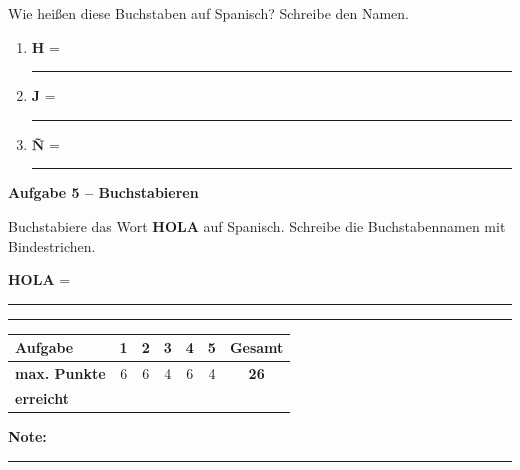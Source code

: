 \documentclass[11pt, a4paper]{article}
\newcommand{\punktebox}[1]{\hfill\fbox{\small \_\_\_/#1}}
\newcommand{\luecke}[1]{\rule{#1}{0.4pt}}
\newcommand{\es}[1]{\textcolor{spanisch}{\textbf{#1}}}
\begin{document}
\noindent Wie heißen diese Buchstaben auf Spanisch? Schreibe den Namen.

\vspace{10pt}

\begin{enumerate}[label=\alph*)]
    \item \textbf{H} = \luecke{4cm}
    \item \textbf{J} = \luecke{4cm}
    \item \textbf{Ñ} = \luecke{4cm}
\end{enumerate}

\vspace{15pt}


\noindent\textbf{\textcolor{spanisch}{Aufgabe 5 -- Buchstabieren}} \punktebox{4}

\noindent Buchstabiere das Wort \es{HOLA} auf Spanisch. Schreibe die Buchstabennamen mit Bindestrichen.

\vspace{10pt}

\noindent
\es{HOLA} = \luecke{10cm}


\vspace{20pt}
\hrule
\vspace{10pt}

\noindent
\begin{tabularx}{\textwidth}{|X|c|c|c|c|c||c|}
\hline
\textbf{Aufgabe} & 1 & 2 & 3 & 4 & 5 & \textbf{Gesamt} \\
\hline
\textbf{max. Punkte} & 6 & 6 & 4 & 6 & 4 & \textbf{26} \\
\hline
\textbf{erreicht} & & & & & & \\[0.6em]
\hline
\end{tabularx}

\vspace{10pt}

\begin{flushright}
\textbf{Note:} \luecke{2cm}
\end{flushright}
\end{document}
